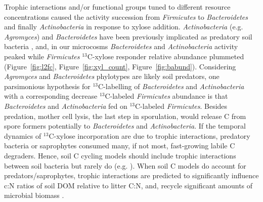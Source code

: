 Trophic interactions and/or functional groups tuned to different resource
concentrations caused the activity succession from \textit{Firmicutes} to
\textit{Bacteroidetes} and finally \textit{Actinobacteria} in response to
xylose addition. \textit{Actinobacteria} (e.g. \textit{Agromyces}) and
\textit{Bacteroidetes} have been previously implicated as predatory soil
bacteria \citep{Lueders2006,16346402}, and,  in our microcosms
\textit{Bacteroidetes} and \textit{Actinobacteria} activity peaked  while
\textit{Firmicutes} $^{13}$C-xylose responder relative abundance plummeted
(Figure~\ref{fig:l2fc}, Figure~\ref{fig:xyl_count},
Figure~\ref{fig:babund}). Considering \textit{Agromyces} and
\textit{Bacteroidetes} phylotypes are likely soil predators, one parsimonious
hypothesis for $^{13}$C-labelling of \textit{Bacteroidetes} and
\textit{Actinobacteria} with a corresponding decrease $^{13}$C-labeled
\textit{Firmicutes} abundance is that \textit{Bacteroidetes} and
\textit{Actinobacteria} fed on $^{13}$C-labeled \textit{Firmicutes}. Besides
predation, mother cell lysis, the last step in sporulation, would release
C from spore formers potentially to \textit{Bacteroidetes} and
\textit{Actinobacteria}. If the temporal dynamics of $^{13}$C-xylose
incorporation are due to trophic interactions, predatory bacteria or
saprophytes consumed many, if not most, fast-growing labile C degraders. Hence,
soil C cycling models should include trophic interactions between soil bacteria
but rarely do (e.g. \citep{Moore1988}). When soil C models do account for
predators/saprophytes, trophic interactions are predicted to significantly
influence c:N ratios of soil DOM relative to litter C:N, and, recycle 
significant amounts of microbial biomass \citep{Kaiser2014a}.


